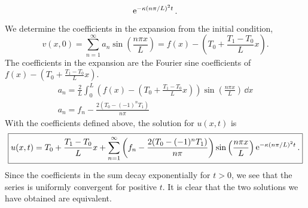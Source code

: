 {\begin{Solution}
\[  \mathop{\mathrm{e}}\nolimits^{-\kappa (n\pi/L)^2 t}.
  \]
  We determine the coefficients in the expansion from the initial condition,
  \[
  v(x,0) = \sum_{n=1}^\infty a_n \sin \left( \frac{n \pi x}{L} \right) 
  = f(x) - \left( T_0 + \frac{T_1 - T_0}{L} x \right).
  \]
  The coefficients in the expansion are the Fourier sine coefficients of
  $f(x) - \left( T_0 + \frac{T_1 - T_0}{L} x \right)$.
  \begin{gather*}
    a_n = \frac{2}{L} \int_0^L \left( 
      f(x) - \left( T_0 + \frac{T_1 - T_0}{L} x \right) \right)
    \sin \left( \frac{n \pi x}{L} \right) \,\dd x \\
    a_n = f_n - \frac{ 2 (T_0 - (-1)^n T_1) }{ n \pi } 
  \end{gather*}
  With the coefficients defined above, the solution for $u(x,t)$ is
  \[
  \boxed{
    u(x,t) = T_0 + \frac{T_1 - T_0}{L} x 
    + \sum_{n=1}^\infty \left( f_n - \frac{ 2 (T_0 - (-1)^n T_1) }{ n \pi } \right)
    \sin \left( \frac{n \pi x}{L} \right) \mathop{\mathrm{e}}\nolimits^{-\kappa (n\pi/L)^2 t}.
    }
  \]
  Since the coefficients in the sum decay exponentially for $t>0$, we 
  see that the series is uniformly convergent for positive $t$.
  It is clear that the two solutions we have obtained are equivalent.
\end{Solution}







}
